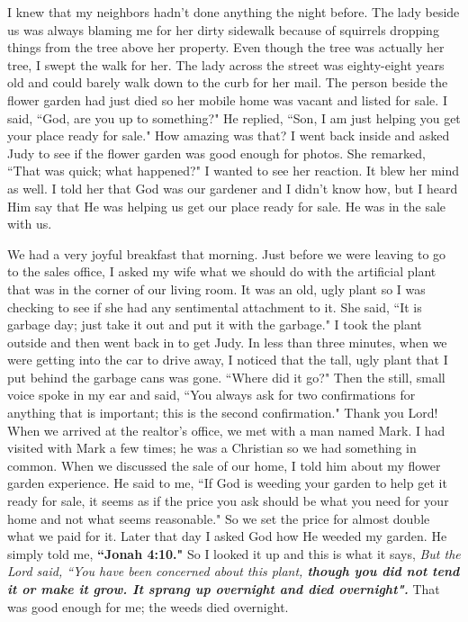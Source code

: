 \documentclass[oneside,12pt]{book}
\begin{document}
I knew that my neighbors hadn't done anything the night before. The lady beside us was always blaming me for her dirty sidewalk because of squirrels dropping things from the tree above her property. Even though the tree was actually her tree, I swept the walk for her. The lady across the street was eighty-eight years old and could barely walk down to the curb for her mail. The person beside the flower garden had just died so her mobile home was vacant and listed for sale. I said, ``God, are you up to something?" He replied, ``Son, I am just helping you get your place ready for sale." How amazing was that? I went back inside and asked Judy to see if the flower garden was good enough for photos. She remarked, ``That was quick; what happened?" I  wanted to see her reaction. It blew her mind as well. I told her that God was our gardener and I didn't know how, but I heard Him say that He was helping us get our place ready for sale. He was in the sale with us.

We had a very joyful breakfast that morning. Just before we were leaving to go to the sales office, I asked my wife what we should do with the artificial plant that was in the corner of our living room. It was an old, ugly plant so I was checking to see if she had any sentimental attachment to it. She said, ``It is garbage day; just take it out and put it with the garbage." I took the plant outside and then went back in to get Judy. In less than three minutes, when we were getting into the car to drive away, I noticed that the tall, ugly plant that I put behind the garbage cans was gone. ``Where did it go?" Then the still, small voice spoke in my ear and said, ``You always ask for two confirmations for anything that is important; this is the second confirmation." Thank you Lord! When we arrived at the realtor's office, we met with a man named Mark. I had visited with Mark a few times; he was a Christian so we had something in common. When we discussed the sale of our home, I told him about my flower garden experience. He said to me, ``If God is weeding your garden to help get it ready for sale, it seems as if the price you ask should be what you need for your home and not what seems reasonable." So we set the price for almost double what we paid for it. Later that day I asked God how He weeded my garden. He simply told me, \textbf{``Jonah 4:10."} So I looked it up and this is what it says, \textit{But the Lord said, ``You have been concerned about this plant, \textbf{though you did not tend it or make it grow. It sprang up overnight and died overnight".}} That was good enough for me; the weeds died overnight.
\end{document}
